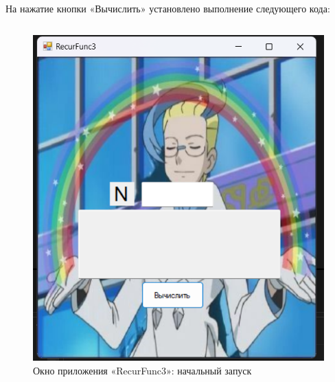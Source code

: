 \documentclass[bachelor, och, pract, times]{SCWorks}
\begin{document}
На нажатие кнопки «Вычислить» установлено выполнение следующего
кода:

\inputminted[fontsize=\footnotesize]{cpp}{Код/RecurFunc3.cpp}



\begin{figure}[H]
    \centering
    \includegraphics[scale=0.7]{Скрины/Снимок экрана 2025-01-03 220231.png}
    \caption{Окно приложения «RecurFunc3»: начальный запуск}\label{fig:recur-02}
\end{figure}
\end{document}
